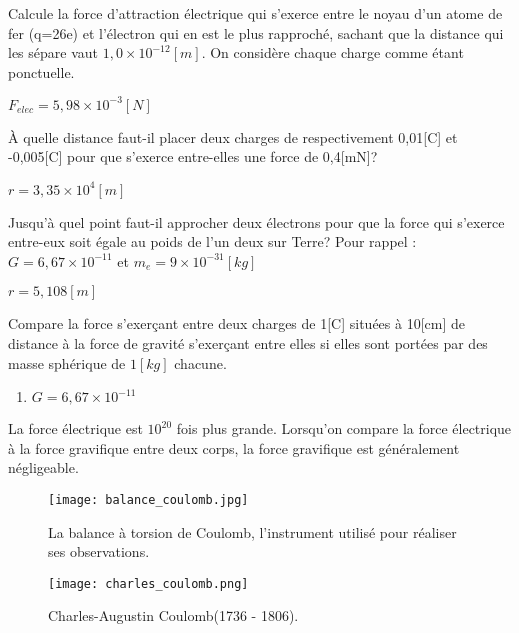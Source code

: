 \begin{exercise}
    Calcule la force d'attraction électrique qui s'exerce entre le noyau d'un atome de fer (q=26e) et l'électron qui en est le plus rapproché, sachant que la distance qui les sépare vaut \(1,0 \times 10^{-12}[m]\). On considère chaque charge comme étant ponctuelle.
\end{exercise}
\begin{solution}
    \(F_{elec}=5,98 \times 10^{-3}[N]\)
\end{solution}

\begin{exercise}
    À quelle distance faut-il placer deux charges de respectivement 0,01[C] et -0,005[C] pour que s'exerce entre-elles une force de 0,4[mN]?
\end{exercise}
\begin{solution}
    \(r=3,35 \times 10^4 [m]\)
\end{solution}

\begin{exercise}
    Jusqu'à quel point faut-il approcher deux électrons pour que la force qui s'exerce entre-eux soit égale au poids de l'un deux sur Terre?
    Pour rappel : \(G=6,67 \times 10^{-11}\) et \(m_e=9 \times 10^{-31} [kg]\)
\end{exercise}
\begin{solution}
    \(r=5,108[m]\)
\end{solution}


\begin{exercise}
    Compare la force s'exerçant entre deux charges de 1[C] situées à 10[cm] de distance à la force de gravité s'exerçant entre elles si elles sont portées par des masse sphérique de \(1 [kg]\) chacune.
    \begin{enumerate}[label=\textbullet]
        \item \(G=6,67 \times 10^{-11}\)
    \end{enumerate}
\end{exercise}
\begin{solution}
    La force électrique est \(10^20\) fois plus grande. Lorsqu'on compare la force électrique à la force gravifique entre deux corps, la force gravifique est généralement négligeable.
\end{solution}

\begin{figure}[!ht]
    \centering
    \texttt{[image: balance\_coulomb.jpg]}
    \caption{La balance à torsion de Coulomb, l'instrument utilisé pour réaliser ses observations.}
    \label{balance_coulomb}
\end{figure}



\begin{figure}[!ht]
    \centering
    \texttt{[image: charles\_coulomb.png]}
    \caption{Charles-Augustin Coulomb(1736 - 1806).}
    \label{charles_coulomb}
\end{figure}